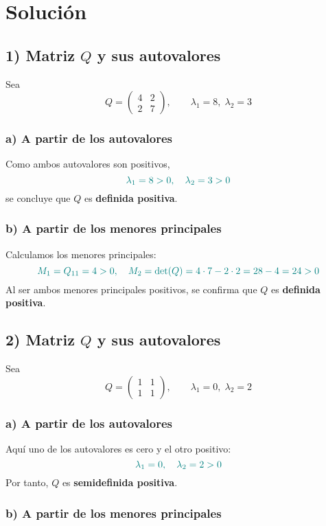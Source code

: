 \documentclass{article}
\begin{document}
\newpage
\section*{Solución}
\subsection*{1) Matriz \(Q\) y sus autovalores}

Sea
\[
Q = \begin{pmatrix}
4 & 2\\
2 & 7
\end{pmatrix},
\qquad
\lambda_1 = 8,\;\lambda_2 = 3
\]

\subsubsection*{a) A partir de los autovalores}

Como ambos autovalores son positivos,
\[
\color{teal}
\lambda_1 = 8 > 0,\quad \lambda_2 = 3 > 0
\]
se concluye que \(Q\) es \textbf{definida positiva}.

\subsubsection*{b) A partir de los menores principales}

Calculamos los menores principales:
\[
\color{teal}
M_1 = Q_{11} = 4 > 0,
\quad
M_2 = \det(Q) = 4\cdot7 - 2\cdot2 = 28 - 4 = 24 > 0
\]
Al ser ambos menores principales positivos, se confirma que \(Q\) es \textbf{definida positiva}.
\subsection*{2) Matriz \(Q\) y sus autovalores}

Sea
\[
Q =
\begin{pmatrix}
1 & 1\\
1 & 1
\end{pmatrix},
\qquad
\lambda_1 = 0,\;\lambda_2 = 2
\]

\subsubsection*{a) A partir de los autovalores}

Aquí uno de los autovalores es cero y el otro positivo:
\[
\color{teal}
\lambda_1 = 0,\quad \lambda_2 = 2 > 0
\]
Por tanto, \(Q\) es \textbf{semidefinida positiva}.

\subsubsection*{b) A partir de los menores principales}
\end{document}
